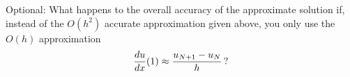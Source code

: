 \begin{enumerate}
      Optional:  What happens to the overall accuracy of the approximate solution if, 
      instead of the $O(h^2)$ accurate approximation given above, you only use the $O(h)$ approximation
           \[ {d u \over dx}(1) \approx {u_{N+1} - u_{N} \over h}\,?\]
\end{enumerate} 


